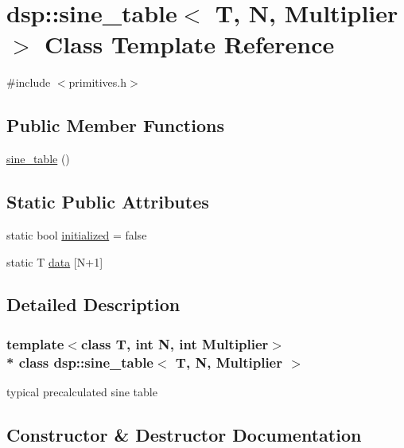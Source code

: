 \hypertarget{classdsp_1_1sine__table}{}\section{dsp\+:\+:sine\+\_\+table$<$ T, N, Multiplier $>$ Class Template Reference}
\label{classdsp_1_1sine__table}


{\ttfamily \#include $<$primitives.\+h$>$}

\subsection*{Public Member Functions}
\begin{DoxyCompactItemize}
\item 
\hyperlink{classdsp_1_1sine__table_a13c8f68bb5be06ef19a97307f4eed31d}{sine\+\_\+table} ()
\end{DoxyCompactItemize}
\subsection*{Static Public Attributes}
\begin{DoxyCompactItemize}
\item 
static bool \hyperlink{classdsp_1_1sine__table_a8141404e40150c7f5dfa74030c99857f}{initialized} = false
\item 
static T \hyperlink{classdsp_1_1sine__table_a7d7a84443865684c94276034afb0c60e}{data} \mbox{[}N+1\mbox{]}
\end{DoxyCompactItemize}


\subsection{Detailed Description}
\subsubsection*{template$<$class T, int N, int Multiplier$>$\\*
class dsp\+::sine\+\_\+table$<$ T, N, Multiplier $>$}

typical precalculated sine table 

\subsection{Constructor \& Destructor Documentation}
